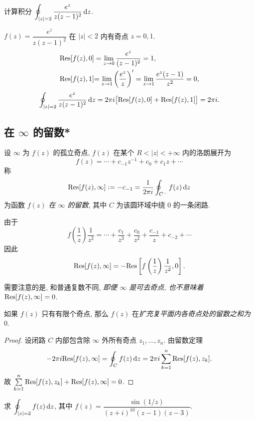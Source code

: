\begin{example}
	计算积分 $\displaystyle\oint_{|z|=2}\frac{e^z}{z(z-1)^2}\,\mathrm{d} z$.
\end{example}

\begin{solution}
		$f(z)=\dfrac{e^z}{z(z-1)^2}$ 在 $|z|<2$ 内有奇点 $z=0,1$.
	{\begin{align*}
		{\mathrm{Res}}[f(z),0]&=\lim_{z\to0}\frac{e^z}{(z-1)^2}=1,\\
		{{\mathrm{Res}}[f(z),1]}&{=\lim_{z\to1}\left(\frac{e^z}z\right)'=\lim_{z\to1}\frac{e^z(z-1)}{z^2}=0,}
	\end{align*}\[\oint_{|z|=2}\frac{e^z}{z(z-1)^2}\,\mathrm{d} z
		=2\pi i\bigl[{\mathrm{Res}}[f(z),0]+{\mathrm{Res}}[f(z),1]\bigr]
		=2\pi i.\]
	}
\end{solution}

\subsection{在 \texorpdfstring{$\infty$}{∞} 的留数*}

\begin{definition}
	设 $\infty$ 为 $f(z)$ 的孤立奇点, $f(z)$ 在某个 $R<|z|<+\infty$ 内的洛朗展开为
	\[f(z)=\cdots+c_{-1}z^{-1}+c_0+c_1z+\cdots\]
	称
	\[{\mathrm{Res}}[f(z),\infty]:=-c_{-1}=\frac1{2\pi i}\oint_{C^-}f(z)\,\mathrm{d} z\]
	为函数 \emph{$f(z)$ 在 $\infty$ 的留数}, 其中 $C$ 为该圆环域中绕 $0$ 的一条闭路.
\end{definition}

由于
\[f\left(\frac1z\right)\frac1{z^2}=\cdots+\frac{c_1}{z^3}+\frac{c_0}{z^2}+\frac{c_{-1}}z+c_{-2}+\cdots\]
因此 
	\[{\mathrm{Res}}[f(z),\infty]=-{\mathrm{Res}}\left[f\left(\frac1z\right)\frac1{z^2},0\right].\]

需要注意的是, 和普通复数不同, \emph{即便 $\infty$ 是可去奇点, 也不意味着 ${\mathrm{Res}}[f(z),\infty]=0$}.

\begin{theorem}
	如果 $f(z)$ 只有有限个奇点, 那么 $f(z)$ 在\emph{扩充复平面内各奇点处的留数之和为 $0$}.
\end{theorem}

\begin{proof}
	设闭路 $C$ 内部包含除 $\infty$ 外所有奇点 $z_1,\dots,z_n$.
	由留数定理
		\[-2\pi i{\mathrm{Res}}[f(z),\infty]=\oint_C f(z)\,\mathrm{d} z=2\pi i\sum_{k=1}^n{\mathrm{Res}}[f(z),z_k].\]
	故 $\sum\limits_{k=1}^n {\mathrm{Res}}[f(z),z_k]+{\mathrm{Res}}[f(z),\infty]=0$.
\end{proof}

\begin{example}
	求 $\displaystyle\oint_{|z|=2}f(z)\,\mathrm{d} z$, 其中 $f(z)=\dfrac{\sin(1/z)}{(z+i)^{10}(z-1)(z-3)}$.
\end{example}

